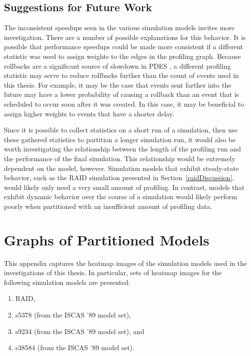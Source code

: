 \documentclass[11pt]{book}
\begin{document}
\section{Suggestions for Future Work}

The inconsistent speedups seen in the various simulation models invites more investigation. There are a number of possible explanations for this behavior. It is possible that performance speedups could be made more consistent if a different statistic was used to assign weights to the edges in the profiling graph. Because rollbacks are a significant source of slowdown in PDES \cite{fujimoto-90}, a different profiling statistic may serve to reduce rollbacks further than the count of events used in this thesis. For example, it may be the case that events sent farther into the future may have a lower probability of causing a rollback than an event that is scheduled to occur soon after it was created. In this case, it may be beneficial to assign higher weights to events that have a shorter delay.

Since it is possible to collect statistics on a short run of a simulation, then use these gathered statistics to partition a longer simulation run, it would also be worth investigating the relationship between the length of the profiling run and the performance of the final simulation. This relationship would be extremely dependent on the model, however. Simulation models that exhibit steady-state behavior, such as the RAID simulation presented in Section~\ref{raidDiscussion}, would likely only need a very small amount of profiling. In contrast, models that exhibit dynamic behavior over the course of a simulation would likely perform poorly when partitioned with an insufficient amount of profiling data.


 \markright{ }

\appendix
\chapter{Graphs of Partitioned Models}\label{appendixA}

This appendix captures the heatmap images of the simulation models used in the
investigations of this thesis. In particular, sets of heatmap images for the following
simulation models are presented:


\begin{enumerate}

  \item RAID,
  \item s5378 (from the ISCAS '89 model set),
  \item s9234 (from the ISCAS '89 model set), and
  \item s38584 (from the ISCAS '89 model set).

\end{enumerate}
\end{document}
